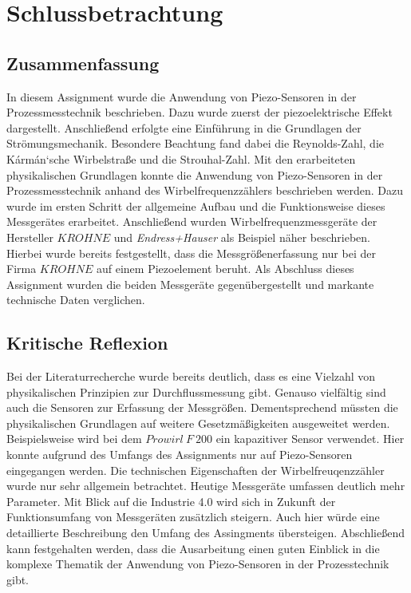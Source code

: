 \section{Schlussbetrachtung}
\subsection{Zusammenfassung}
In diesem Assignment wurde die Anwendung von Piezo-Sensoren in der Prozessmesstechnik beschrieben. Dazu wurde zuerst der piezoelektrische Effekt dargestellt. Anschließend erfolgte eine Einführung in die Grundlagen der Strömungsmechanik. Besondere Beachtung fand dabei die Reynolds-Zahl, die K\'{a}rm\'{a}n`sche Wirbelstraße und die Strouhal-Zahl. Mit den erarbeiteten physikalischen Grundlagen konnte die Anwendung von Piezo-Sensoren in der Prozessmesstechnik anhand des Wirbelfrequenzzählers beschrieben werden. Dazu wurde im ersten Schritt der allgemeine Aufbau und die Funktionsweise dieses Messgerätes erarbeitet. Anschließend wurden Wirbelfrequenzmessgeräte der Hersteller $KROHNE$ und \textit{Endress+Hauser} als Beispiel näher beschrieben. Hierbei wurde bereits festgestellt, dass die Messgrößenerfassung nur bei der Firma $KROHNE$ auf einem Piezoelement beruht. Als Abschluss dieses Assignment wurden die beiden Messgeräte gegenübergestellt und markante technische Daten verglichen.
\subsection{Kritische Reflexion}
Bei der Literaturrecherche wurde bereits deutlich, dass es eine Vielzahl von physikalischen Prinzipien zur Durchflussmessung gibt. Genauso vielfältig sind auch die Sensoren zur Erfassung der Messgrößen. Dementsprechend müssten die physikalischen Grundlagen auf weitere Gesetzmäßigkeiten ausgeweitet werden. Beispielsweise wird bei dem $Prowirl \: F \: 200$ ein kapazitiver Sensor verwendet. Hier konnte aufgrund des Umfangs des Assignments nur auf Piezo-Sensoren eingegangen werden. Die technischen Eigenschaften der Wirbelfreuqenzzähler wurde nur sehr allgemein betrachtet. Heutige Messgeräte umfassen deutlich mehr Parameter. Mit Blick auf die Industrie 4.0 wird sich in Zukunft der Funktionsumfang von Messgeräten zusätzlich steigern. Auch hier würde eine detaillierte Beschreibung den Umfang des Assingments übersteigen. Abschließend kann festgehalten werden, dass die Ausarbeitung einen guten Einblick in die komplexe Thematik der Anwendung von Piezo-Sensoren in der Prozesstechnik gibt.